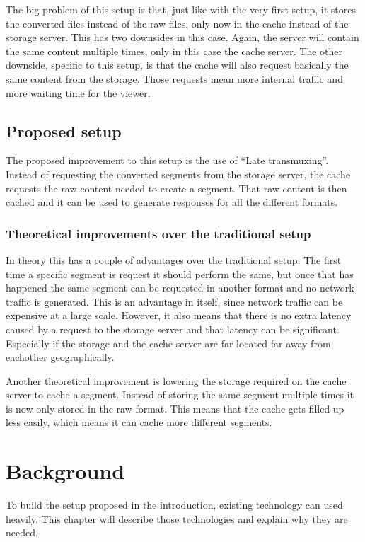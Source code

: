 \documentclass[twoside,openright]{uva-bachelor-thesis}
\begin{document}
The big problem of this setup is that, just like with the very first setup, it
stores the converted files instead of the raw files, only now in the cache
instead of the storage server. This has two downsides in this case. Again, the
server will contain the same content multiple times, only in this case the cache
server. The other downside, specific to this setup, is that the cache will also
request basically the same content from the storage. Those requests mean more
internal traffic and more waiting time for the viewer.

\section{Proposed setup}
The proposed improvement to this setup is the use of ``Late transmuxing''.
Instead of requesting the converted segments from the storage server, the cache
requests the raw content needed to create a segment. That raw content is then
cached and it can be used to generate responses for all the different formats.

\subsection{Theoretical improvements over the traditional setup}
In theory this has a couple of advantages over the traditional setup. The first
time a specific segment is request it should perform the same, but once that has
happened the same segment can be requested in another format and no network
traffic is generated. This is an advantage in itself, since network traffic can
be expensive at a large scale. However, it also means that there is no extra
latency caused by a request to the storage server and that latency can be
significant. Especially if the storage and the cache server are far located far
away from eachother geographically.

Another theoretical improvement is lowering the storage required on the cache
server to cache a segment. Instead of storing the same segment multiple times it
is now only stored in the raw format. This means that the cache gets filled up
less easily, which means it can cache more different segments.








\chapter{Background}
To build the setup proposed in the introduction, existing technology can used
heavily. This chapter will describe those technologies and explain why they are
needed.
\end{document}

